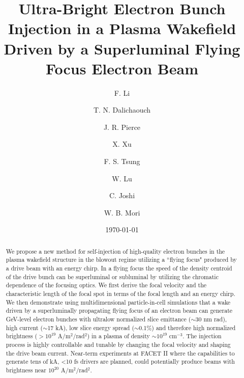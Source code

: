\documentclass[
aps,
prl,
reprint,
superscriptaddress,
amsmath,
amssymb,
showpacs
]{revtex4-2}
\newcommand{\Bunit}{A/m$^2$/rad$^2$}
\begin{document}

\title{Ultra-Bright Electron Bunch Injection in a Plasma Wakefield Driven by a Superluminal Flying Focus Electron Beam}

\author{F. Li}
\author{T. N. Dalichaouch}
\author{J. R. Pierce}
\author{X. Xu}
\author{F. S. Tsung}
\author{W. Lu}
\author{C. Joshi}
\author{W. B. Mori}

\date{\today}

\begin{abstract}

We propose a new method for self-injection of high-quality electron bunches in the plasma wakefield structure in the blowout regime utilizing a ``flying focus" produced by a drive beam with an energy chirp. In a flying focus the speed of the density centroid of the drive bunch can be superluminal or subluminal by utilizing the chromatic dependence of the focusing optics. We first derive the focal velocity and the characteristic length of the focal spot in terms of the focal length and an energy chirp. We then demonstrate using multidimensional particle-in-cell simulations that a wake driven by a superluminally propagating flying focus of an electron beam can generate GeV-level electron bunches with ultralow normalized slice emittance ($\sim$30 nm rad), high current ($\sim$17 kA), low slice energy spread ($\sim$0.1\%) and  therefore high normalized brightness ($>10^{19}$ \Bunit) in a plasma of density $\sim10^{19}$ cm$^{-3}$. The injection process is highly controllable and tunable by changing the focal velocity and shaping the drive beam current.
Near-term experiments at FACET II where the capabilities to generate tens of kA, <10 fs drivers are planned, could potentially produce beams with brightness near $10^{20}$ \Bunit.

\end{abstract}
\end{document}
